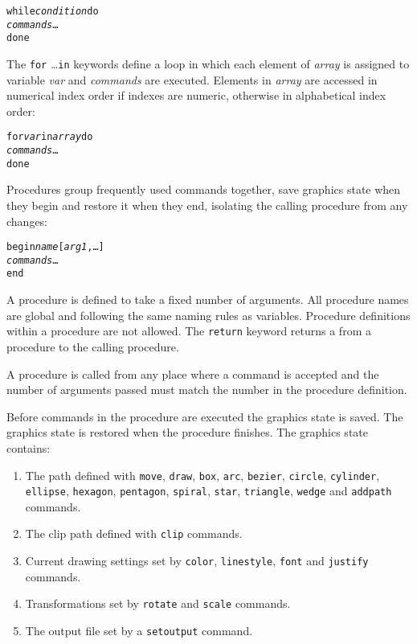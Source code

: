 \begin{alltt}
while \textit{condition} do
  \textit{commands} \dots
done
\end{alltt}

The \texttt{for} \dots \texttt{in} keywords define a loop in which
each element of \textit{array} is assigned to variable \textit{var}
and \textit{commands} are executed.
Elements in \textit{array} are accessed in numerical index order if
indexes are numeric, otherwise in alphabetical index order:

\begin{alltt}
for \textit{var} in \textit{array} do
  \textit{commands} \dots
done
\end{alltt}

Procedures group frequently used commands together, save
graphics state when they begin and restore it when they end,
isolating the calling procedure from any changes:

\begin{alltt}
begin \textit{name} [\textit{arg1}, \dots]
  \textit{commands} \dots
end
\end{alltt}

A procedure is defined to take a fixed number of arguments.
All procedure names are global and following the same naming
rules as variables.
Procedure definitions within a procedure are not allowed.
The \texttt{return} keyword returns a
from a procedure to the calling procedure.

A procedure is called from any place where a command is accepted
and the number of arguments passed must match the number 
in the procedure definition.

Before commands in the procedure are executed
the graphics state is saved.
\label{graphicsstate}
The graphics state is restored when the procedure finishes.
The graphics state contains:

\begin{enumerate}
\item
The path defined with
\texttt{move},
\texttt{draw},
\texttt{box},
\texttt{arc},
\texttt{bezier},
\texttt{circle},
\texttt{cylinder},
\texttt{ellipse},
\texttt{hexagon},
\texttt{pentagon},
\texttt{spiral},
\texttt{star},
\texttt{triangle},
\texttt{wedge}
and
\texttt{addpath}
commands.

\item
The clip path defined with
\texttt{clip} commands.

\item
Current drawing settings set by
\texttt{color},
\texttt{linestyle},
\texttt{font} and \texttt{justify}
commands.

\item
Transformations set by \texttt{rotate} and \texttt{scale} commands.

\item
The output file set by a \texttt{setoutput} command.
\end{enumerate}

